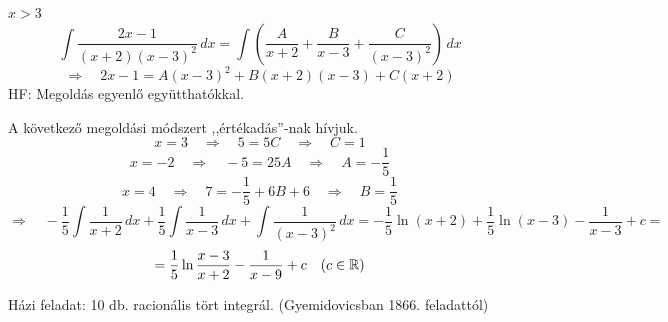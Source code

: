 \documentclass[a4paper,11.5pt]{article}
\begin{document}
	\begin{task}$x>3$
		\[ \int\frac{2x-1}{(x+2)(x-3)^2}\,dx=\int\left(\frac{A}{x+2}+\frac{B}{x-3}+\frac{C}{(x-3)^2}\right)\,dx \]
		\[ \Rightarrow\quad 2x-1=A(x-3)^2+B(x+2)(x-3)+C(x+2) \]
		HF: Megoldás egyenlő együtthatókkal.
		
		A következő megoldási módszert ,,értékadás''-nak hívjuk.
		\[ x=3\quad \Rightarrow\quad 5=5C\quad \Rightarrow \quad C=1 \]
		\[ x=-2\quad \Rightarrow\quad -5=25A\quad \Rightarrow\quad A=-\frac{1}{5} \]
		\[ x=4\quad \Rightarrow\quad 7=-\frac{1}{5}+6B+6\quad \Rightarrow\quad B=\frac{1}{5} \]
		\[ \Rightarrow\quad -\frac{1}{5}\int\frac{1}{x+2}\,dx+\frac{1}{5}\int\frac{1}{x-3}\,dx+\int\frac{1}{(x-3)^2}\,dx=-\frac{1}{5}\ln(x+2)+\frac{1}{5}\ln(x-3)-\frac{1}{x-3}+c= \]
		\[ = \frac{1}{5}\ln\frac{x-3}{x+2}-\frac{1}{x-9}+c\quad (c\in\mathbb{R}) \]
	\end{task}
	Házi feladat: 10 db. racionális tört integrál. (Gyemidovicsban 1866. feladattól)
	\bigskip
	
\end{document}
